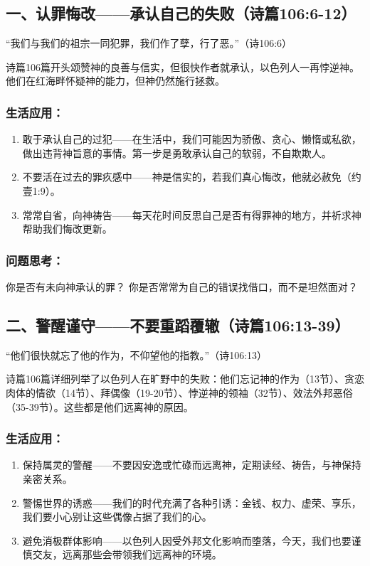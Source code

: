 \documentclass[a4paper, 12pt]{article}
\begin{document}
\subsection*{一、认罪悔改——承认自己的失败（诗篇106:6-12）}
“我们与我们的祖宗一同犯罪，我们作了孽，行了恶。”（诗106:6）

诗篇106篇开头颂赞神的良善与信实，但很快作者就承认，以色列人一再悖逆神。他们在红海畔怀疑神的能力，但神仍然施行拯救。

\subsubsection*{生活应用：}
\begin{enumerate}
    \item 敢于承认自己的过犯——在生活中，我们可能因为骄傲、贪心、懒惰或私欲，做出违背神旨意的事情。第一步是勇敢承认自己的软弱，不自欺欺人。

    \item 不要活在过去的罪疚感中——神是信实的，若我们真心悔改，他就必赦免（约壹1:9）。

    \item 常常自省，向神祷告——每天花时间反思自己是否有得罪神的地方，并祈求神帮助我们悔改更新。

\end{enumerate}
\subsubsection*{问题思考：}

你是否有未向神承认的罪？
你是否常常为自己的错误找借口，而不是坦然面对？
\subsection*{二、警醒谨守——不要重蹈覆辙（诗篇106:13-39）}
“他们很快就忘了他的作为，不仰望他的指教。”（诗106:13）

诗篇106篇详细列举了以色列人在旷野中的失败：他们忘记神的作为（13节）、贪恋肉体的情欲（14节）、拜偶像（19-20节）、悖逆神的领袖（32节）、效法外邦恶俗（35-39节）。这些都是他们远离神的原因。

\subsubsection*{生活应用：}
\begin{enumerate}
    \item 保持属灵的警醒——不要因安逸或忙碌而远离神，定期读经、祷告，与神保持亲密关系。

    \item 警惕世界的诱惑——我们的时代充满了各种引诱：金钱、权力、虚荣、享乐，我们要小心别让这些偶像占据了我们的心。

    \item 避免消极群体影响——以色列人因受外邦文化影响而堕落，今天，我们也要谨慎交友，远离那些会带领我们远离神的环境。

\end{enumerate}
\end{document}
